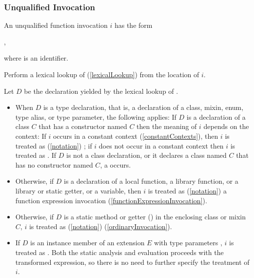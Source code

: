 \documentclass[makeidx]{article}
\begin{document}
{\subsubsection{Unqualified Invocation}

\LMHash{}%
An unqualified function invocation $i$ has the form

\noindent
\code{\id<\TypeArgumentListStd>(\ArgumentListStd)},

\noindent
where \id{} is an identifier.


\LMHash{}%
Perform a lexical lookup of \id{}
(\ref{lexicalLookup})
from the location of $i$.

\LMHash{}%
Let $D$ be the declaration yielded by the lexical lookup of \id.

\begin{itemize}
\item
  When $D$ is a type declaration, that is,
  a declaration of a class, mixin, enum, type alias, or type parameter,
  the following applies:
  If $D$ is a declaration of a class $C$
  that has a constructor named $C$
  then the meaning of $i$ depends on the context:
  If $i$ occurs in a constant context
  (\ref{constantContexts}),
  then $i$ is treated as
  (\ref{notation})
  ;
  if $i$ does not occur in a constant context
  then $i$ is treated as .
  If $D$ is not a class declaration,
  or it declares a class named $C$ that has no constructor named $C$,
  a  occurs.
\item
  Otherwise, if $D$ is a declaration of
  a local function,
  a library function, or
  a library or static getter, or a variable,
  then $i$ is treated as
  (\ref{notation})
  a function expression invocation
  (\ref{functionExpressionInvocation}).
\item
  Otherwise, if $D$ is
  a static method or getter
  ()
  in the enclosing class or mixin $C$,
  $i$ is treated as
  (\ref{notation})
  (\ref{ordinaryInvocation}).
\item
  If $D$ is an instance member of an extension $E$
  with type parameters ,
  $i$ is treated as .
  Both the static analysis and evaluation
  proceeds with the transformed expression,
  so there is no need to further specify the treatment of $i$.


\end{itemize}}
\end{document}

